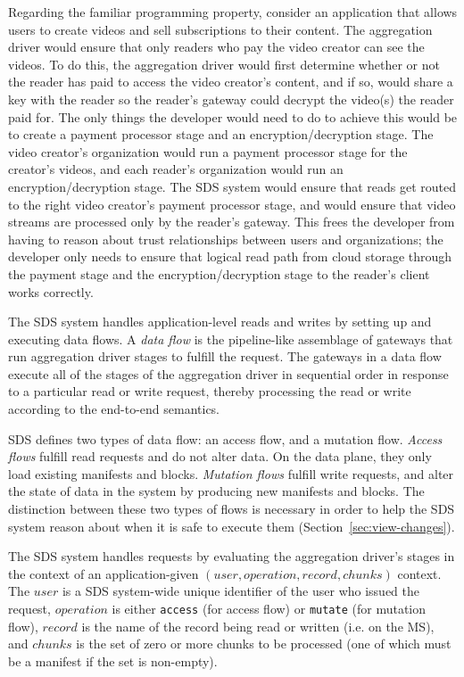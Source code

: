 Regarding the familiar programming property, consider an application that allows users to
create videos and sell subscriptions to their content.  The aggregation
driver would ensure that only readers who pay the video creator can see
the videos.  To do this, the aggregation driver would first determine whether or not the
reader has paid to access the video creator's content, and if so, would
share a key with the reader so the reader's gateway could decrypt the
video(s) the reader paid for.  The only things the developer would
need to do to achieve this would be to create a payment processor stage and an
encryption/decryption stage.  The video creator's organization would run a
payment processor stage for the creator's videos, and each reader's
organization would run an encryption/decryption stage.  The SDS system
would ensure that reads get routed to the right video creator's payment
processor stage, and would ensure that video streams are processed only by
the reader's gateway.  This frees the developer from having to reason
about trust relationships between users and organizations; the developer
only needs to ensure that logical read path from cloud storage through the payment
stage and the encryption/decryption stage to the reader's client works
correctly.

The SDS system handles application-level reads and writes by setting up and
executing data flows.  A \emph{data flow} is the pipeline-like assemblage of gateways
that run aggregation driver stages to fulfill the request.  The gateways in a data flow execute all
of the stages of the aggregation driver in sequential order in response to a
particular read or write request, thereby processing the
read or write according to the end-to-end semantics.

SDS defines two types of data flow:  an access flow, and a mutation flow.
\emph{Access flows} fulfill read requests and do not alter data.  On the data
plane, they only load existing manifests and blocks.
\emph{Mutation flows} fulfill write requests, and alter
the state of data in the system by producing new manifests and blocks.
The distinction between these two types of flows is necessary in order to help
the SDS system reason about when it is safe to execute them 
(Section~\ref{sec:view-changes}).

The SDS system handles requests by evaluating the aggregation driver's stages in the context of
an application-given $(user, operation, record, chunks)$ context.  The
$user$ is a SDS system-wide unique identifier of the user who issued the request,
$operation$ is either \texttt{access} (for access flow) or \texttt{mutate} (for
mutation flow), $record$ is the name of the record being read or written (i.e. on
the MS), and $chunks$ is the set of zero or more chunks to be processed (one of which must be
a manifest if the set is non-empty).

